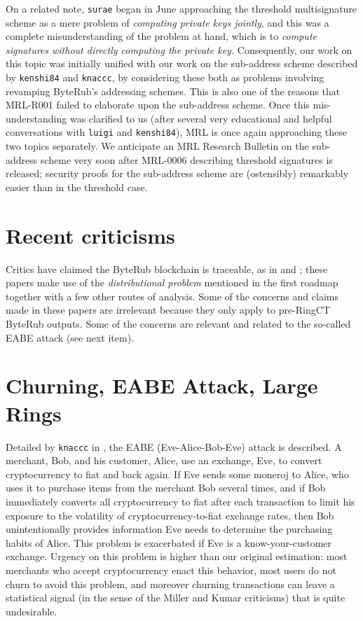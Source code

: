 \documentclass[12pt,english]{mrl}
\theoremstyle{definition}
\numberwithin{equation}{section}
\numberwithin{figure}{section}
\numberwithin{equation}{section}
\numberwithin{equation}{section}
\numberwithin{figure}{section}
\begin{document}
    
On a related note, \texttt{surae} began in June approaching the threshold multisignature scheme as a mere problem of \textit{computing private keys jointly}, and this was a complete misunderstanding of the problem at hand, which is to \textit{compute signatures without directly computing the private key.} Consequently, our work on this topic was initially unified with our work on the sub-address scheme described by \texttt{kenshi84} and \texttt{knaccc}, by considering these both as problems involving revamping ByteRub's addressing schemes. This is also one of the reasons that MRL-R001 failed to elaborate upon the sub-address scheme. Once this mis-understanding was clarified to us (after several very educational and helpful conversations with \texttt{luigi} and \texttt{kenshi84}), MRL is once again approaching these two topics separately. We anticipate an MRL Research Bulletin on the sub-address scheme very soon after MRL-0006 describing threshold signatures is released; security proofs for the sub-address scheme are (ostensibly) remarkably easier than in the threshold case.
    
\section{Recent criticisms} 

Critics have claimed the ByteRub blockchain is traceable, as in \cite{miller2017empirical} and \cite{kumar2017traceability}; these papers make use of the \emph{distributional problem} mentioned in the first roadmap together with a few other routes of analysis. Some of the concerns and claims made in these papers are irrelevant because they only apply to pre-RingCT ByteRub outputs. Some of the concerns are relevant and related to the so-called EABE attack (see next item).
    
    
    
\section{Churning, EABE Attack, Large Rings}

Detailed by \texttt{knaccc} in \cite{knaccc2017}, the EABE (Eve-Alice-Bob-Eve) attack is described. A merchant, Bob, and his customer, Alice, use an exchange, Eve, to convert cryptocurrency to fiat and back again. If Eve sends some moneroj to Alice, who uses it to purchase items from the merchant Bob several times, and if Bob immediately converts all cryptocurrency to fiat after each transaction to limit his exposure to the volatility of cryptocurrency-to-fiat exchange rates, then Bob unintentionally provides information Eve needs to determine the purchasing habits of Alice. This problem is exacerbated if Eve is a know-your-customer exchange. Urgency on this problem is higher than our original estimation: most merchants who accept cryptocurrency enact this behavior, most users do not churn to avoid this problem, and moreover churning transactions can leave a statistical signal (in the sense of the Miller and Kumar criticisms) that is quite undesirable.  
    
\end{document}
